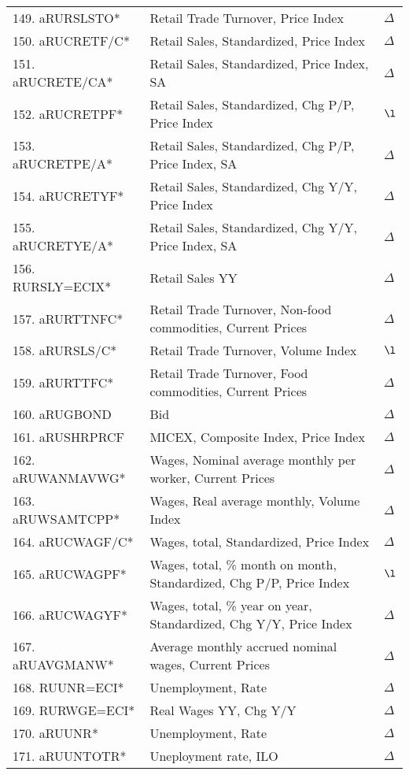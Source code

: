 \documentclass[a4paper, 14pt]{article}
\begin{document}
\begin{center}
\begin{longtable}{p{5.5cm} p{10cm} p{0.15cm}}
	149. aRURSLSTO* &  Retail Trade Turnover, Price Index & $\Delta$\\
	150. aRUCRETF/C* &  Retail Sales, Standardized, Price Index & $\Delta$\\
	151. aRUCRETE/CA* &  Retail Sales, Standardized, Price Index, SA & $\Delta$\\
	152. aRUCRETPF* &  Retail Sales, Standardized, Chg P/P, Price Index & $\l$\\
	153. aRUCRETPE/A* &  Retail Sales, Standardized, Chg P/P, Price Index, SA & $\Delta$\\
	154. aRUCRETYF* &  Retail Sales, Standardized, Chg Y/Y, Price Index & $\Delta$\\
	155. aRUCRETYE/A* &  Retail Sales, Standardized, Chg Y/Y, Price Index, SA & $\Delta$\\
	156. RURSLY=ECIX* &  Retail Sales YY & $\Delta$\\
	157. aRURTTNFC* &  Retail Trade Turnover, Non-food commodities, Current Prices & $\Delta$\\
	158. aRURSLS/C* &  Retail Trade Turnover, Volume Index & $\l$\\
	159. aRURTTFC* &  Retail Trade Turnover, Food commodities, Current Prices & $\Delta$\\
	160. aRUGBOND &  Bid & $\Delta$\\
	161. aRUSHRPRCF &  MICEX, Composite Index, Price Index & $\Delta$\\
	162. aRUWANMAVWG* &  Wages, Nominal average monthly per worker, Current Prices & $\Delta$\\
	163. aRUWSAMTCPP* &  Wages, Real average monthly, Volume Index & $\Delta$\\
	164. aRUCWAGF/C* &  Wages, total, Standardized, Price Index & $\Delta$\\
	165. aRUCWAGPF* &  Wages, total, \% month on month, Standardized, Chg P/P, Price Index & $\l$\\
	166. aRUCWAGYF* &  Wages, total, \% year on year, Standardized, Chg Y/Y, Price Index & $\Delta$\\
	167. aRUAVGMANW* &  Average monthly accrued nominal wages, Current Prices & $\Delta$\\
	168. RUUNR=ECI* &  Unemployment, Rate & $\Delta$\\
	169. RURWGE=ECI* &  Real Wages YY, Chg Y/Y & $\Delta$\\
	170. aRUUNR* &  Unemployment, Rate & $\Delta$\\
	171. aRUUNTOTR* &  Uneployment rate, ILO & $\Delta$\\

\end{longtable}
\end{center}
\end{document}
